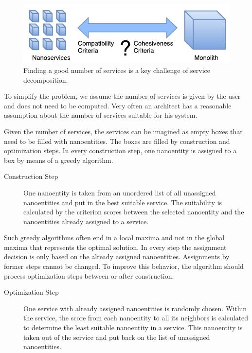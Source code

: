 \begin{figure}[H]
	\begin{center}
		\includegraphics[scale=1]{diagrams/HeuristicApproach.pdf}
	\end{center}
	\caption{Finding a good number of services is a key challenge of service decomposition.}
	\label{fig:numberOfServices}
\end{figure}

To simplify the problem, we assume the number of services is given by the user and does not need to be computed. Very often an architect has a reasonable assumption about the number of services suitable for his system. 

Given the number of services, the services can be imagined as empty boxes that need to be filled with nanoentities. The boxes are filled by construction and optimization steps. In every construction step, one nanoentity is assigned to a box by means of a greedy algorithm.

\begin{description}
	\item[Construction Step] One nanoentity is taken from an unordered list of all unassigned nanoentities and put in the best suitable service. The suitability is calculated by the criterion scores between the selected nanoentity and the nanoentities already assigned to a service. 
\end{description}

Such greedy algorithms often end in a local maxima and not in the global maxima that represents the optimal solution. In every step the assignment decision is only based on the already assigned nanoentities. Assignments by former steps cannot be changed. 
To improve this behavior, the algorithm should process optimization steps between or after construction. 

\begin{description}
\item[Optimization Step] One service with already assigned nanoentities is randomly chosen. Within the service, the score from each nanoentity to all its neighbors is calculated to determine the least suitable nanoentity in a service. This nanoentity is taken out of the service and put back on the list of unassigned nanoentities.
\end{description}


